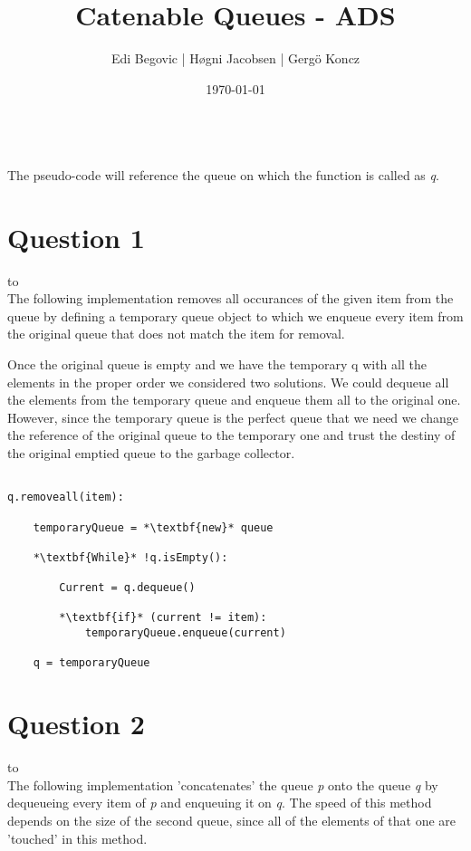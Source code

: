\documentclass[a4paper]{article}
\title{Catenable Queues - ADS}
\author{Edi Begovic | Høgni Jacobsen | Gergö Koncz}
\date{\today}
\def\headline#1{\hbox to \hsize{\hrulefill\quad\lower.3em\hbox{#1}\quad\hrulefill}}
\begin{document}
 
\maketitle

\ \\
\noindent
The pseudo-code will reference the queue on which the function is called as \textit{q}.
\ \\
\section*{Question 1}
\headline{-} \ \\

\noindent
The following implementation removes all occurances of the given item from the queue by defining a temporary queue
object to which we enqueue every item from the original queue that does not match the item for removal. 

Once the original queue is empty and we have the temporary q with all the elements in the proper order we considered two solutions. We could dequeue all the elements from the temporary queue and enqueue them all to the original one. However, since the temporary queue is the perfect queue that we need we change the reference of the original queue to the temporary one and trust the destiny of the original emptied queue to the garbage collector. 

\noindent
\begin{lstlisting}[escapeinside={{*}{*}}]

q.removeall(item):

    temporaryQueue = *\textbf{new}* queue

    *\textbf{While}* !q.isEmpty():

        Current = q.dequeue()
        
        *\textbf{if}* (current != item):
            temporaryQueue.enqueue(current)
    
    q = temporaryQueue

\end{lstlisting}

\newpage
\section*{Question 2}
\headline{-} \ \\
The following implementation 'concatenates' the queue \textit{p} onto the queue \textit{q} by
dequeueing every item of \textit{p} and enqueuing it on \textit{q}. The speed of this method depends on the size of the second queue, since all of the elements of that one are 'touched' in this method.
\end{document}
